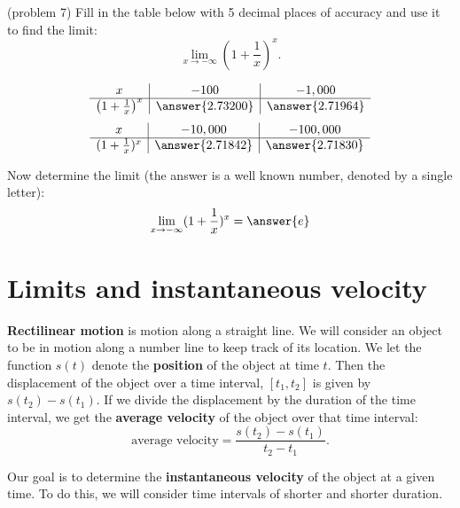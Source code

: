 \documentclass[handout]{ximera}
\begin{document}
\begin{problem}(problem 7)
Fill in the table below with 5 decimal places of accuracy and use it to find the limit:
\[\lim_{x \to -\infty} \left(1+\frac{1}{x}\right)^x.\]

\begin{prompt}
\begin{center}
\[
\begin{array}{ c | c | c }
  x & -100 & -1,000   \\ 
	\hline 
	 \left(1+\frac{1}{x}\right)^x & \answer{2.73200} & \answer{2.71964} 
\end{array}
\]
\[
\begin{array}{ c | c | c  }
  x  & -10,000 & -100,000 \\ 
	\hline 
	 (1+\frac{1}{x})^x  & \answer{2.71842} & \answer{2.71830}
\end{array}
\]
\end{center}
Now determine the limit (the answer is a well known number, denoted by a single letter):
\[
\lim_{x \to -\infty} (1+\frac{1}{x})^x = \answer{e}
\]
\end{prompt}
\end{problem}



\section{Limits and instantaneous velocity}


\textbf{Rectilinear motion} is motion along a straight line. We will consider an object to be in motion along a number line to keep track of its location.
We let the function $s(t)$ denote the \textbf{position} of the object at time $t$. Then the displacement of the object over a time interval,
$[t_1, t_2]$ is given by $s(t_2) - s(t_1)$.  If we divide the displacement by the duration of the time interval, we get the 
\textbf{average velocity} of the object over that time interval:
\[
\text{average velocity} = \frac{s(t_2) - s(t_1)}{t_2 -t_1}.
\]


Our goal is to determine the \textbf{instantaneous velocity} of the 
object at a given time.  To do this, we will consider time intervals of shorter and shorter duration.
\end{document}

